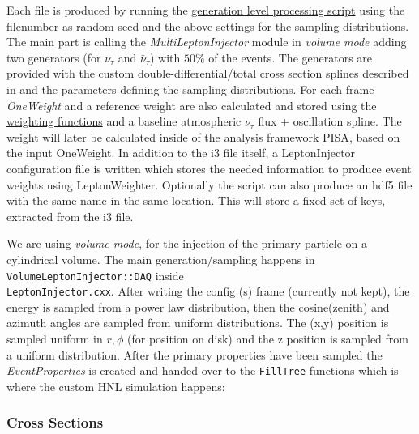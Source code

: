 Each file is produced by running the \href{https://github.com/LeanderFischer/I3_HNL_Decay/blob/master/submission_scripts/process/process_Gen.py}{generation level processing script} using the filenumber as random seed and the above settings for the sampling distributions. The main part is calling the \textit{MultiLeptonInjector} module in \textit{volume mode} adding two generators (for $\nu_\tau$ and $\bar{\nu}_\tau$) with $50\%$ of the events. The generators are provided with the custom double-differential/total cross section splines described in  and the parameters defining the sampling distributions. For each frame \textit{OneWeight} and a reference weight are also calculated and stored using the \href{https://github.com/LeanderFischer/LeptonInjector-HNL/blob/main/LeptonInjector/python/hnl_weighting.py}{weighting functions} and a baseline atmospheric $\nu_\tau$ flux + oscillation spline. The weight will later be calculated inside of the analysis framework \href{https://github.com/icecube/pisa}{PISA}, based on the input OneWeight. In addition to the i3 file itself, a LeptonInjector configuration file is written which stores the needed information to produce event weights using LeptonWeighter. Optionally the script can also produce an hdf5 file with the same name in the same location. This will store a fixed set of keys, extracted from the i3 file.

We are using \textit{volume mode}, for the injection of the primary particle on a cylindrical volume. The main generation/sampling happens in \texttt{VolumeLeptonInjector::DAQ} inside \\ \texttt{LeptonInjector.cxx}. After writing the config (s) frame (currently not kept), the energy is sampled from a power law distribution, then the cosine(zenith) and azimuth angles are sampled from uniform distributions. The (x,y) position is sampled uniform in $r, \phi$ (for position on disk) and the z position is sampled from a uniform distribution. After the primary properties have been sampled the \textit{EventProperties} is created and handed over to the \texttt{FillTree} functions which is where the custom HNL simulation happens:

\subsubsection{Cross Sections} 



